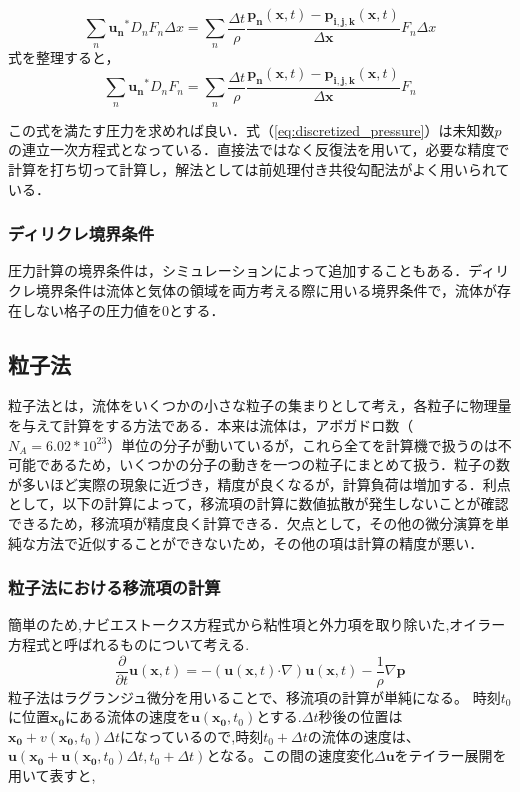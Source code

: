 \documentclass[a4j,12pt]{jreport}
\begin{document}
$$ \sum_{n}\bm{u_n}^*D_nF_n\Delta x = \sum_{n}\frac{\Delta t}{\rho}\frac{\bm{p_n}(\bm{x},t) - \bm{p_{i,j,k}}(\bm{x},t)}{\Delta \bm{x}}F_n\Delta x $$
式を整理すると，
\begin{equation}\label{eq:discretized_pressure}
\sum_{n}\bm{u_n}^*D_nF_n= \sum_{n}\frac{\Delta t}{\rho}\frac{\bm{p_n}(\bm{x},t) - \bm{p_{i,j,k}}(\bm{x},t)}{\Delta \bm{x}}F_n
\end{equation} 

この式を満たす圧力を求めれば良い．式（\ref{eq:discretized_pressure}）は未知数$p$の連立一次方程式となっている．直接法ではなく反復法を用いて，必要な精度で計算を打ち切って計算し，解法としては前処理付き共役勾配法がよく用いられている．

\subsubsection{ディリクレ境界条件} \label{subsec:Dirichlet}
圧力計算の境界条件は，シミュレーションによって追加することもある．ディリクレ境界条件は流体と気体の領域を両方考える際に用いる境界条件で，流体が存在しない格子の圧力値を0とする．
\subsection{粒子法} \label{subsec:particle}
粒子法とは，流体をいくつかの小さな粒子の集まりとして考え，各粒子に物理量を与えて計算をする方法である．本来は流体は，アボガドロ数（$N_A = 6.02*10^{23}$）単位の分子が動いているが，これら全てを計算機で扱うのは不可能であるため，いくつかの分子の動きを一つの粒子にまとめて扱う．粒子の数が多いほど実際の現象に近づき，精度が良くなるが，計算負荷は増加する．利点として，以下の計算によって，移流項の計算に数値拡散が発生しないことが確認できるため，移流項が精度良く計算できる．欠点として，その他の微分演算を単純な方法で近似することができないため，その他の項は計算の精度が悪い．
\subsubsection{粒子法における移流項の計算} \label{subsec:particleadvect}
簡単のため,ナビエストークス方程式から粘性項と外力項を取り除いた,オイラー方程式と呼ばれるものについて考える.
$$\frac{\partial}{\partial t}\bm{u}(\bm{x},t) = -(\bm{u}(\bm{x},t)\boldsymbol{\cdot}\nabla)\bm{u}(\bm{x},t) - \frac{1}{\rho}\nabla \bm{p}$$
粒子法はラグランジュ微分を用いることで、移流項の計算が単純になる。
時刻$t_0$に位置$\bm{x_0}$にある流体の速度を$\bm{u}(\bm{x_0},t_0)$とする.$\Delta t$秒後の位置は$\bm{x_0}+v(\bm{x_0},t_0)\Delta t$になっているので,時刻$t_0+\Delta t$の流体の速度は、$\bm{u}(\bm{x_0}+\bm{u}(\bm{x_0},t_0)\Delta t,t_0+\Delta t)$となる。この間の速度変化$\Delta \bm{u}$をテイラー展開を用いて表すと,
\end{document}
